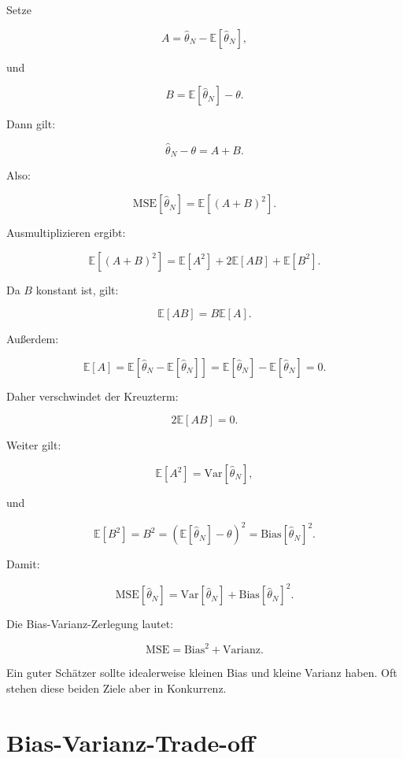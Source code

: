 Setze

\[
    A
    =
    \hat{\theta}_N
    -
    \mathbb{E}[\hat{\theta}_N],
\]

und

\[
    B
    =
    \mathbb{E}[\hat{\theta}_N]
    -
    \theta.
\]

Dann gilt:

\[
    \hat{\theta}_N-\theta
    =
    A+B.
\]

Also:

\[
    \mathrm{MSE}[\hat{\theta}_N]
    =
    \mathbb{E}[(A+B)^2].
\]

Ausmultiplizieren ergibt:

\[
    \mathbb{E}[(A+B)^2]
    =
    \mathbb{E}[A^2]
    +
    2\mathbb{E}[AB]
    +
    \mathbb{E}[B^2].
\]

Da \(B\) konstant ist, gilt:

\[
    \mathbb{E}[AB]
    =
    B\mathbb{E}[A].
\]

Außerdem:

\[
    \mathbb{E}[A]
    =
    \mathbb{E}\left[
        \hat{\theta}_N
        -
        \mathbb{E}[\hat{\theta}_N]
    \right]
    =
    \mathbb{E}[\hat{\theta}_N]
    -
    \mathbb{E}[\hat{\theta}_N]
    =
    0.
\]

Daher verschwindet der Kreuzterm:

\[
    2\mathbb{E}[AB] = 0.
\]

Weiter gilt:

\[
    \mathbb{E}[A^2]
    =
    \mathrm{Var}[\hat{\theta}_N],
\]

und

\[
    \mathbb{E}[B^2]
    =
    B^2
    =
    \left(
        \mathbb{E}[\hat{\theta}_N]
        -
        \theta
    \right)^2
    =
    \mathrm{Bias}[\hat{\theta}_N]^2.
\]

Damit:

\[
    \mathrm{MSE}[\hat{\theta}_N]
    =
    \mathrm{Var}[\hat{\theta}_N]
    +
    \mathrm{Bias}[\hat{\theta}_N]^2.
\]

\begin{conceptbox}
Die Bias-Varianz-Zerlegung lautet:

\[
    \mathrm{MSE}
    =
    \text{Bias}^2
    +
    \text{Varianz}.
\]

Ein guter Schätzer sollte idealerweise kleinen Bias und kleine Varianz haben.
Oft stehen diese beiden Ziele aber in Konkurrenz.
\end{conceptbox}

\section{Bias-Varianz-Trade-off}


